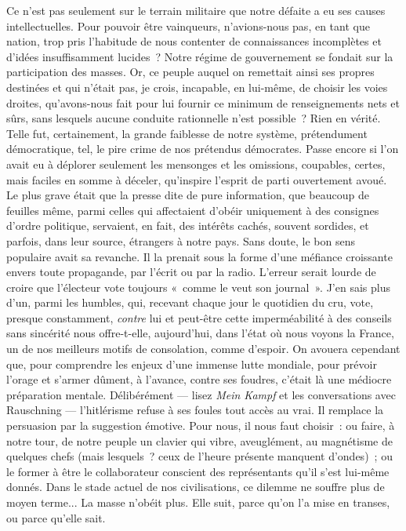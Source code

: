 \documentclass[french,twoside]{book} %
\begin{document}
Ce n’est pas seulement sur le terrain militaire que notre défaite a eu ses causes intellectuelles. Pour pouvoir être vainqueurs, n’avions-nous pas, en tant que nation, trop pris l’habitude de nous contenter de connaissances incomplètes et d’idées insuffisamment lucides ? Notre régime de gouvernement se fondait sur la participation des masses. Or, ce peuple auquel on remettait ainsi ses propres destinées et qui n’était pas, je crois, incapable, en lui-même, de choisir les voies droites, qu’avons-nous fait pour lui fournir ce minimum de renseignements nets et sûrs, sans lesquels aucune conduite rationnelle n’est possible ? Rien en vérité. Telle fut, certainement, la grande faiblesse de notre système, prétendument démocratique, tel, le pire crime de nos prétendus démocrates. Passe encore si l’on avait eu à déplorer seulement les mensonges et les omissions, coupables, certes, mais faciles en somme à déceler, qu’inspire l’esprit de parti ouvertement avoué. Le plus grave était que la presse dite de pure information, que beaucoup de feuilles même, parmi celles qui affectaient d’obéir uniquement à des consignes d’ordre politique, servaient, en fait, des intérêts cachés, souvent sordides, et parfois, dans leur source, étrangers à notre pays. Sans doute, le bon sens populaire avait sa revanche. Il la prenait sous la forme d’une méfiance croissante envers toute propagande, par l’écrit ou par la radio. L’erreur serait lourde de croire que l’électeur vote toujours « comme le veut son journal ». J’en sais plus d’un, parmi les humbles, qui, recevant chaque jour le quotidien du cru, vote, presque constamment, \emph{contre} lui et peut-être cette imperméabilité à des conseils sans sincérité nous offre-t-elle, aujourd’hui, dans l’état où nous voyons la France, un de nos meilleurs motifs de consolation, comme d’espoir. On avouera cependant   que, pour comprendre les enjeux d’une immense lutte mondiale, pour prévoir l’orage et s’armer dûment, à l’avance, contre ses foudres, c’était là une médiocre préparation mentale. Délibérément — lisez \emph{Mein Kampf} et les conversations avec Rauschning — l’hitlérisme refuse à ses foules tout accès au vrai. Il remplace la persuasion par la suggestion émotive. Pour nous, il nous faut choisir : ou faire, à notre tour, de notre peuple un clavier qui vibre, aveuglément, au magnétisme de quelques chefs (mais lesquels ? ceux de l’heure présente manquent d’ondes) ; ou le former à être le collaborateur conscient des représentants qu’il s’est lui-même donnés. Dans le stade actuel de nos civilisations, ce dilemme ne souffre plus de moyen terme... La masse n’obéit plus. Elle suit, parce qu’on l’a mise en transes, ou parce qu’elle sait.\par
\end{document}
